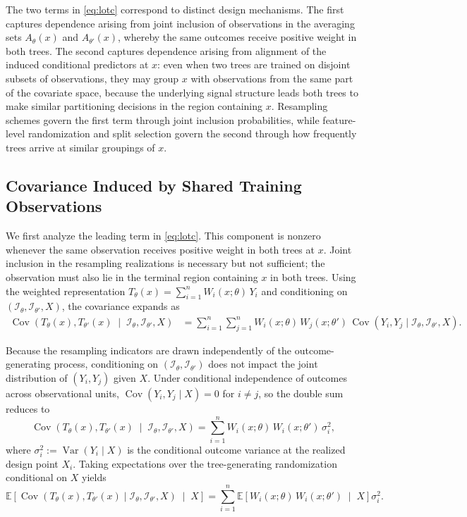 \documentclass[11pt]{article}
\theoremstyle{plain}
\theoremstyle{definition}
\theoremstyle{remark}
\DeclareMathOperator{\Var}{Var}
\DeclareMathOperator{\Cov}{Cov}
\begin{document}
The two terms in \eqref{eq:lotc} correspond to distinct design mechanisms. The first captures dependence arising from joint inclusion of observations in the averaging sets $A_\theta(x)$ and $A_{\theta'}(x)$, whereby the same outcomes receive positive weight in both trees. The second captures dependence arising from alignment of the induced conditional predictors at $x$: even when two trees are trained on disjoint subsets of observations, they may group $x$ with observations from the same part of the covariate space, because the underlying signal structure leads both trees to make similar partitioning decisions in the region containing $x$. Resampling schemes govern the first term through joint inclusion probabilities, while feature-level randomization and split selection govern the second through how frequently trees arrive at similar groupings of $x$.

\subsection{Covariance Induced by Shared Training Observations}
\label{subsec:obs_overlap}

We first analyze the leading term in \eqref{eq:lotc}. This component is nonzero whenever the same observation receives positive weight in both trees at $x$. Joint inclusion in the resampling realizations is necessary but not sufficient; the observation must also lie in the terminal region containing $x$ in both trees. Using the weighted representation $T_\theta(x)=\sum_{i=1}^n W_i(x;\theta)\,Y_i$ and conditioning on $(\mathcal I_\theta,\mathcal I_{\theta'},X)$, the covariance expands as
\begin{align*}
	\Cov\!\left(
	T_\theta(x),T_{\theta'}(x)
	\;\middle|\;
	\mathcal I_\theta,\mathcal I_{\theta'}, X
	\right)
	&=
	\sum_{i=1}^n\sum_{j=1}^n
	W_i(x;\theta)\,W_j(x;\theta')\,
	\Cov(Y_i,Y_j\mid \mathcal I_\theta,\mathcal I_{\theta'}, X).
\end{align*}

Because the resampling indicators are drawn independently of the outcome-generating process, conditioning on $(\mathcal I_\theta,\mathcal I_{\theta'})$ does not impact the joint distribution of $(Y_i, Y_j)$ given $X$. Under conditional independence of outcomes across observational units, $\Cov(Y_i,Y_j\mid X)=0$ for $i\neq j$, so the double sum reduces to
\[
\Cov\!\left(
T_\theta(x),T_{\theta'}(x)
\;\middle|\;
\mathcal I_\theta,\mathcal I_{\theta'}, X
\right)
=
\sum_{i=1}^n
W_i(x;\theta)\,W_i(x;\theta')\,\sigma_i^2,
\]
where $\sigma_i^2 := \Var(Y_i \mid X)$ is the conditional outcome variance at the realized design point $X_i$. Taking expectations over the tree-generating randomization conditional on $X$ yields
\[
\mathbb E\!\left[
\Cov\!\left(
T_\theta(x),T_{\theta'}(x)
\mid
\mathcal I_\theta,\mathcal I_{\theta'}, X
\right)
\;\middle|\;
X
\right]
=
\sum_{i=1}^n
\mathbb E\!\left[
W_i(x;\theta)\,W_i(x;\theta')
\;\middle|\;
X
\right]
\sigma_i^2.
\]
\end{document}
